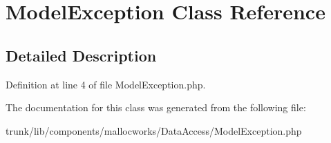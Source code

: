 \hypertarget{class_utopia_1_1_components_1_1_model_1_1_model_exception}{
\section{ModelException Class Reference}
\label{class_utopia_1_1_components_1_1_model_1_1_model_exception}
}


\subsection{Detailed Description}


Definition at line 4 of file ModelException.php.



The documentation for this class was generated from the following file:\begin{DoxyCompactItemize}
\item 
trunk/lib/components/mallocworks/DataAccess/ModelException.php\end{DoxyCompactItemize}
